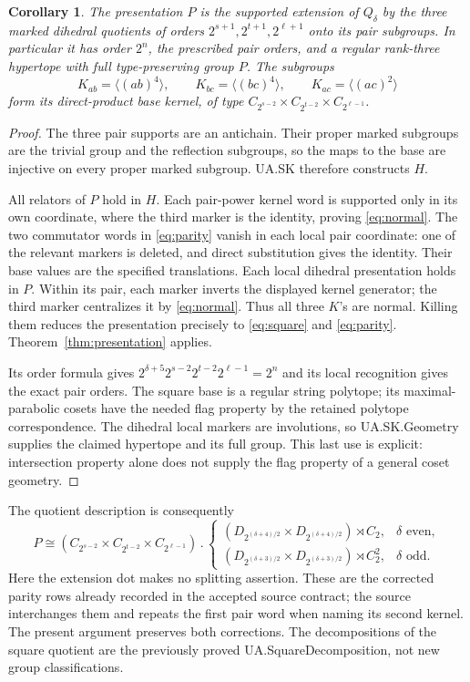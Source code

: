 \documentclass[11pt,a4paper]{article}
\newtheorem{corollary}[theorem]{Corollary}
\theoremstyle{remark}\newtheorem{remark}[theorem]{Remark}
\newcommand{\gen}[1]{\langle #1\rangle}
\begin{document}
\begin{corollary}\label{cor:hypertope}
The presentation $P$ is the supported extension of $Q_\delta$ by the three
marked dihedral quotients of orders $2^{s+1},2^{t+1},2^{\ell+1}$ onto
its pair subgroups. In particular it has order $2^n$, the prescribed pair
orders, and a regular rank-three hypertope with full type-preserving group
$P$. The subgroups
\[
 K_{ab}=\gen{(ab)^4},\qquad K_{bc}=\gen{(bc)^4},\qquad
 K_{ac}=\gen{(ac)^2}
\]
form its direct-product base kernel, of type
$C_{2^{s-2}}\times C_{2^{t-2}}\times C_{2^{\ell-1}}$.
\end{corollary}
\begin{proof}
The three pair supports are an antichain. Their proper marked subgroups
are the trivial group and the reflection subgroups, so the maps to the
base are injective on every proper marked subgroup. UA.SK therefore
constructs $H$.

All relators of $P$ hold in $H$. Each pair-power kernel word is supported
only in its own coordinate, where the third marker is the identity, proving
\eqref{eq:normal}. The two commutator words in \eqref{eq:parity} vanish in
each local pair coordinate: one of the relevant markers is deleted, and
direct substitution gives the identity. Their base values are the specified
translations. Each local dihedral presentation holds in $P$. Within its
pair, each marker inverts the displayed kernel generator; the third marker
centralizes it by \eqref{eq:normal}. Thus all three $K$'s are normal.
Killing them reduces the presentation precisely to \eqref{eq:square} and
\eqref{eq:parity}. Theorem~\ref{thm:presentation} applies.

Its order formula gives
$2^{\delta+5}2^{s-2}2^{t-2}2^{\ell-1}=2^n$ and its local recognition gives
the exact pair orders. The square base is a regular string polytope; its
maximal-parabolic cosets have the needed flag property by the retained
polytope correspondence. The dihedral local markers are involutions, so
UA.SK.Geometry supplies the claimed hypertope and its full group. This
last use is explicit: intersection property alone does not supply the flag
property of a general coset geometry.
\end{proof}

The quotient description is consequently
\[
 P\cong
 (C_{2^{s-2}}\times C_{2^{t-2}}\times C_{2^{\ell-1}})\mathbin{.}
 \begin{cases}
 (D_{2^{(\delta+4)/2}}\times D_{2^{(\delta+4)/2}})\rtimes C_2,
       &\delta\text{ even},\\
 (D_{2^{(\delta+3)/2}}\times D_{2^{(\delta+3)/2}})\rtimes C_2^2,
       &\delta\text{ odd}.
 \end{cases}
\]
Here the extension dot makes no splitting assertion. These are the corrected
parity rows already recorded in the accepted source contract; the source
interchanges them and repeats the first pair word when naming its second
kernel. The present argument preserves both corrections. The decompositions
of the square quotient are the previously proved UA.SquareDecomposition,
not new group classifications.
\end{document}
